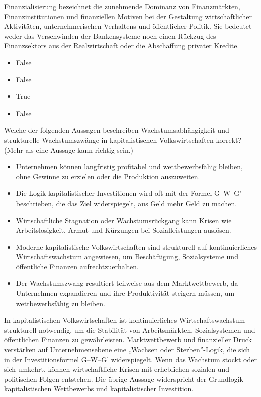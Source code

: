 \documentclass[
  nswissgerman,
  a4paper,
  DIV=11,
  numbers=noendperiod,
  oneside,
  openany]{scrreprt}
\providecommand{\tightlist}{%
  \setlength{\itemsep}{0pt}\setlength{\parskip}{0pt}}
\begin{document}
Finanzialisierung bezeichnet die zunehmende Dominanz von Finanzmärkten,
Finanzinstitutionen und finanziellen Motiven bei der Gestaltung
wirtschaftlicher Aktivitäten, unternehmerischen Verhaltens und
öffentlicher Politik. Sie bedeutet weder das Verschwinden der
Bankensysteme noch einen Rückzug des Finanzsektors aus der
Realwirtschaft oder die Abschaffung privater Kredite.

\begin{itemize}
\tightlist
\item
  False
\item
  False
\item
  True
\item
  False
\end{itemize}

Welche der folgenden Aussagen beschreiben Wachstumsabhängigkeit und
strukturelle Wachstumszwänge in kapitalistischen Volkswirtschaften
korrekt? (Mehr als eine Aussage kann richtig sein.)

\begin{itemize}
\tightlist
\item[$\square$]
  Unternehmen können langfristig profitabel und wettbewerbsfähig
  bleiben, ohne Gewinne zu erzielen oder die Produktion auszuweiten.
\item[$\square$]
  Die Logik kapitalistischer Investitionen wird oft mit der Formel
  G--W--G' beschrieben, die das Ziel widerspiegelt, aus Geld mehr Geld
  zu machen.
\item[$\square$]
  Wirtschaftliche Stagnation oder Wachstumsrückgang kann Krisen wie
  Arbeitslosigkeit, Armut und Kürzungen bei Sozialleistungen auslösen.
\item[$\square$]
  Moderne kapitalistische Volkswirtschaften sind strukturell auf
  kontinuierliches Wirtschaftswachstum angewiesen, um Beschäftigung,
  Sozialsysteme und öffentliche Finanzen aufrechtzuerhalten.
\item[$\square$]
  Der Wachstumszwang resultiert teilweise aus dem Marktwettbewerb, da
  Unternehmen expandieren und ihre Produktivität steigern müssen, um
  wettbewerbsfähig zu bleiben.
\end{itemize}

In kapitalistischen Volkswirtschaften ist kontinuierliches
Wirtschaftswachstum strukturell notwendig, um die Stabilität von
Arbeitsmärkten, Sozialsystemen und öffentlichen Finanzen zu
gewährleisten. Marktwettbewerb und finanzieller Druck verstärken auf
Unternehmensebene eine „Wachsen oder Sterben''-Logik, die sich in der
Investitionsformel G--W--G' widerspiegelt. Wenn das Wachstum stockt oder
sich umkehrt, können wirtschaftliche Krisen mit erheblichen sozialen und
politischen Folgen entstehen. Die übrige Aussage widerspricht der
Grundlogik kapitalistischen Wettbewerbs und kapitalistischer
Investition.
\end{document}
